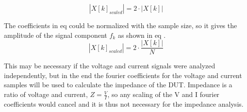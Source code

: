 \begin{equation}\label{eq:4_7_2_SA8}
    |X[k]_{scaled}| = 2 \cdot |X[k]|
\end{equation}

The coefficients in eq  could be normalized with the sample size, so it gives the amplitude of the signal component $f_k$ as shown in eq .
\begin{equation}\label{eq:4_7_2_SA9}
    |X[k]_{scaled}| = 2 \cdot \frac{|X[k]|}{N}
\end{equation}

This may be necessary if the voltage and current signals were analyzed independently, but in the end the fourier coefficients for the voltage and current samples will be used to calculate the impedance of the DUT. Impedance is a ratio of voltage and current, $Z = \frac{V}{I}$, so any scaling of the V and I fourier coefficients would cancel and it is thus not necessary for the impedance analysis.
